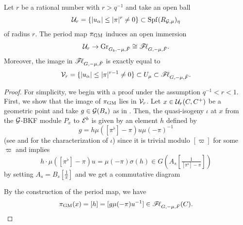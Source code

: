 \documentclass[12pt,reqno]{amsart}
\begin{document}
\begin{thm} \label{thm:computation_period_map}
    Let $r$ be a rational number with $r > q^{-1}$ and take an open ball 
    \[
        {\mathcal{U}}_r = \{ \lvert u_\alpha \rvert \leq \lvert \pi \rvert^r \neq 0 \} \subset {\operatorname{Spf}}(R_{{\mathcal{G}}, \mu})_\eta
    \]
    of radius $r$. The period map $\pi_{\operatorname{GM}}$ induces an open immersion 
    \[
        {\mathcal{U}}_r \to {\operatorname{Gr}}_{G_b, -\mu, \breve{F}} \cong {\mathscr{F}\!\ell}_{G, -\mu, \breve{F}}. 
    \]
    Moreover, the image in ${\mathscr{F}\!\ell}_{G, -\mu, \breve{F}}$ is exactly equal to
    \[
        {\mathcal{V}}_r = \{ \lvert u_\alpha \rvert \leq \lvert \pi \rvert^{r - 1} \neq 0 \} \subset U_{\mu} \subset {\mathscr{F}\!\ell}_{G, -\mu, \breve{F}}. 
    \]
\end{thm}
\begin{proof}
    For simplicity, we begin with a proof under the assumption $q^{-1} < r < 1$. First, we show that the image of $\pi_{\operatorname{GM}}$ lies in ${\mathcal{V}}_r$. Let $x \in {\mathcal{U}}_r(C, C^+)$ be a geometric point and take $g \in {\mathcal{G}}(B_s)$ as in . Then, the quasi-isogeny $\iota$ at $x$ from the ${\mathcal{G}}$-BKF module $P_x$ to ${\mathcal{E}}^b$ is given by an element $h$ defined by
    \[
        g = h \mu([\pi^{\flat}] - \pi) u \mu(-\pi)^{-1}
    \]  
    (see \cite[Lemma 2.24]{Gle26_local_Shimura} and \cite[Proposition 5.2.6]{Ito25a} for the characterization of $\iota$) since it is trivial modulo $[\varpi]$ for some $\varpi$ and  implies
    \[
        h \cdot \mu([\pi^\flat] - \pi)u = \mu(-\pi)\sigma(h) \in G(A_s[\tfrac{1}{[\pi^\flat] - \pi}])
    \]
    by setting $A_s = B_s[\tfrac{1}{\pi}]$ and we get a commutative  diagram 
    \begin{center}
    \end{center}
    By the construction of the period map, we have
    \[
        \pi_{\operatorname{GM}}(x) = [h] = [g \mu(-\pi) u^{-1}] \in {\mathscr{F}\!\ell}_{G, -\mu, \breve{F}}(C). 
\]
\end{proof}
\end{document}
